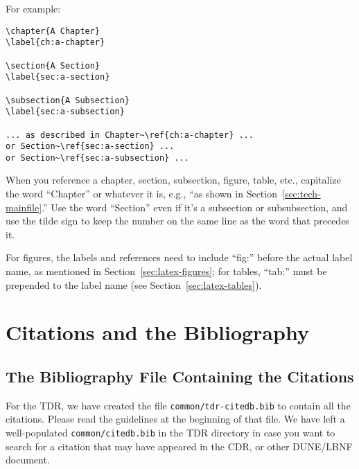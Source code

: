 For example:

\begin{verbatim}
\chapter{A Chapter}
\label{ch:a-chapter}

\section{A Section}
\label{sec:a-section}

\subsection{A Subsection}
\label{sec:a-subsection}

... as described in Chapter~\ref{ch:a-chapter} ... 
or Section~\ref{sec:a-section} ... 
or Section~\ref{sec:a-subsection} ...

\end{verbatim}

When you reference a chapter, section, subsection, figure, table,
etc., capitalize the word ``Chapter'' or whatever it is, e.g., ``as
shown in Section~\ref{sec:tech-mainfile}.''
Use the word ``Section'' even if it's a subsection or subsubsection,
and use the tilde sign to keep the number on the same line as the word
that precedes it.

For figures, the labels and references need to include ``fig:'' before the actual label name, as mentioned in Section~\ref{sec:latex-figures}; for tables, ``tab:'' must be prepended to the label name (see Section~\ref{sec:latex-tables}).


\section{Citations and the Bibliography}
\label{sec:latex-cit}

\subsection{The Bibliography File Containing the Citations}
\label{sec:latex-bib-file}

For the TDR, we have created the file \texttt{common/tdr-citedb.bib} to contain all the citations. Please read the guidelines at the
beginning of that file. We have left a well-populated \texttt{common/citedb.bib} in the TDR directory in case you want to search for a citation
 that may have appeared in the CDR, or other DUNE/LBNF document.

